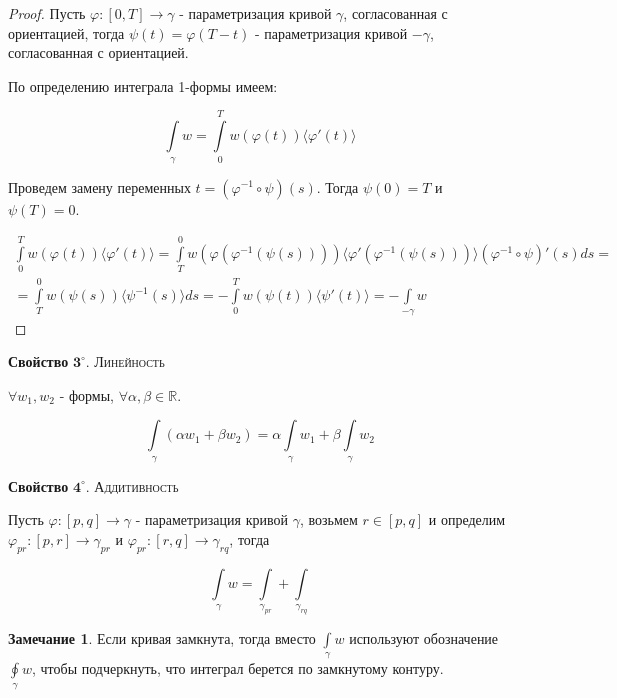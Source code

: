 \documentclass[a5paper]{article}
\newcounter{through}
\theoremstyle{plain}
\theoremstyle{definition}
\newtheorem{remark}[through]{Замечание}
\numberwithin{through}{section}
\numberwithin{equation}{section}
\begin{document}
	\begin{proof}
		Пусть $\varphi : [0, T] \to \gamma$ - параметризация кривой $\gamma$, согласованная с ориентацией, тогда $\psi(t)=\varphi(T-t)$ - параметризация кривой $-\gamma$, согласованная с ориентацией. 
		
		По определению интеграла 1-формы имеем:
		
		\begin{equation*}
		\int\limits_{\gamma} w = \int\limits_{0}^{T} w(\varphi(t)) \langle \varphi'(t) \rangle 
		\end{equation*}
		
		Проведем замену переменных $t = (\varphi^{-1} \circ \psi)(s)$. Тогда $\psi(0)=T$ и $\psi(T)=0$.
		
		\begin{multline*}
			\int\limits_{0}^{T} w(\varphi(t)) \langle \varphi'(t) \rangle  = \int\limits_{T}^{0} w(\varphi(\varphi^{-1}(\psi(s)))) \langle \varphi'(\varphi^{-1}(\psi(s))) \rangle (\varphi^{-1} \circ \psi)'(s) ds =\\= \int\limits_{T}^{0} w(\psi(s)) \langle \psi^{-1}(s) \rangle ds = -\int\limits_{0}^{T} w(\psi(t)) \langle \psi'(t) \rangle = -\int\limits_{-\gamma} w
		\end{multline*}
	\end{proof}

	{\bf Свойство} $\mathbf{3^\circ.}$
	{\textsc{Линейность}}
	
	$\forall w_1, w_2$ - формы, $\forall \alpha, \beta \in \mathbb{R}$.
	
	\begin{equation*}
		\int\limits_{\gamma} (\alpha w_1 + \beta w_2) = \alpha \int\limits_{\gamma} w_1 + \beta \int\limits_{\gamma} w_2
	\end{equation*}
	
	{\bf Свойство} $\mathbf{4^\circ.}$
	{\textsc{Аддитивность}}
	
	Пусть $\varphi : [p, q] \to \gamma$ - параметризация кривой $\gamma$, возьмем $r \in [p, q]$ и определим $\varphi_{pr} : [p, r] \to \gamma_{pr}$ и $\varphi_{pr} : [r, q] \to \gamma_{rq}$, тогда
	
	\begin{equation*}
		\int\limits_{\gamma} w = \int\limits_{\gamma_{pr}} + \int\limits_{\gamma_{rq}}
	\end{equation*}


\begin{remark}
	Если кривая замкнута, тогда вместо $\int\limits_{\gamma} w$ используют обозначение $\oint\limits_{\gamma} w$, чтобы подчеркнуть, что интеграл берется по замкнутому контуру.
\end{remark}
\end{document}
